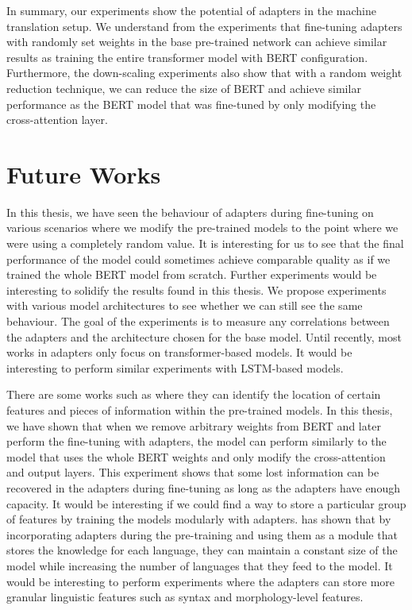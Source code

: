In summary, our experiments show the potential of adapters in the machine translation setup. We understand from the experiments that fine-tuning adapters with randomly set weights in the base pre-trained network can achieve similar results as training the entire transformer model with BERT configuration. Furthermore, the down-scaling experiments also show that with a random weight reduction technique, we can reduce the size of BERT and achieve similar performance as the BERT model that was fine-tuned by only modifying the cross-attention layer.

\section{Future Works}
In this thesis, we have seen the behaviour of adapters during fine-tuning on various scenarios where we modify the pre-trained models to the point where we were using a completely random value. It is interesting for us to see that the final performance of the model could sometimes achieve comparable quality as if we trained the whole BERT model from scratch. Further experiments would be interesting to solidify the results found in this thesis. We propose experiments with various model architectures to see whether we can still see the same behaviour. The goal of the experiments is to measure any correlations between the adapters and the architecture chosen for the base model. Until recently, most works in adapters only focus on transformer-based models. It would be interesting to perform similar experiments with LSTM-based models.

There are some works such as  where they can identify the location of certain features and pieces of information within the pre-trained models. In this thesis, we have shown that when we remove arbitrary weights from BERT and later perform the fine-tuning with adapters, the model can perform similarly to the model that uses the whole BERT weights and only modify the cross-attention and output layers. This experiment shows that some lost information can be recovered in the adapters during fine-tuning as long as the adapters have enough capacity. It would be interesting if we could find a way to store a particular group of features by training the models modularly with adapters.  has shown that by incorporating adapters during the pre-training and using them as a module that stores the knowledge for each language, they can maintain a constant size of the model while increasing the number of languages that they feed to the model. It would be interesting to perform experiments where the adapters can store more granular linguistic features such as syntax and morphology-level features.